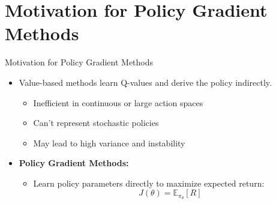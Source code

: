 \section{Motivation for Policy Gradient Methods}
\begin{frame}{Motivation for Policy Gradient Methods}
    \begin{itemize}
        \item Value-based methods learn Q-values and derive the policy indirectly.
        \begin{itemize}
            \item Inefficient in continuous or large action spaces
            \item Can’t represent stochastic policies
            \item May lead to high variance and instability
        \end{itemize}
        \vspace{2em}
        \item[]\textbf{Policy Gradient Methods:}
        \begin{itemize}
            \item Learn policy parameters directly to maximize expected return:
            \[
                J(\theta) = \mathbb{E}_{\pi_\theta}[R]
            \]
        \end{itemize}
    \end{itemize}
\end{frame}